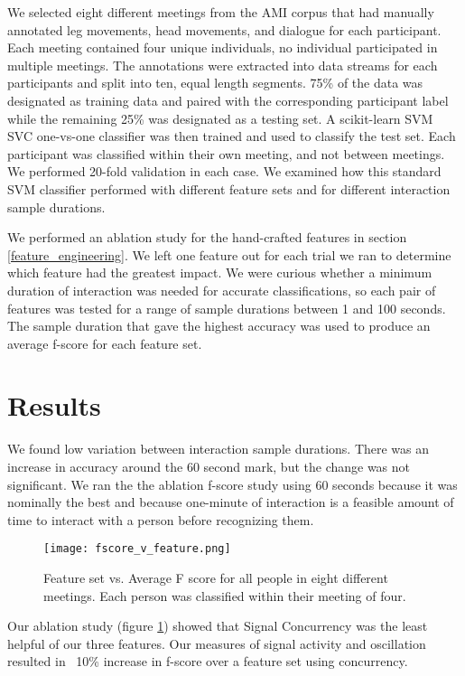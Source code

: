 \documentclass[conference]{IEEEtran}
\begin{document}
We selected eight different meetings from the AMI corpus that had manually annotated leg movements, head movements, and dialogue for each participant. Each meeting contained four unique individuals, no individual participated in multiple meetings. The annotations were extracted into data streams for each participants and split into ten, equal length segments. 75\% of the data was designated as training data and paired with the corresponding participant label while the remaining 25\% was designated as a testing set. A scikit-learn SVM SVC one-vs-one classifier was then trained and used to classify the test set. Each participant was classified within their own meeting, and not between meetings. We performed 20-fold validation in each case. We examined how this standard SVM classifier performed with different feature sets and for different interaction sample durations. 

We performed an ablation study for the hand-crafted features in section \ref{feature_engineering}. We left one feature out for each trial we ran to determine which feature had the greatest impact. We were curious whether a minimum duration of interaction was needed for accurate classifications, so each pair of features was tested for a range of sample durations between 1 and 100 seconds. The sample duration that gave the highest accuracy was used to produce an average f-score for each feature set. 

\section{Results}

We found low variation between interaction sample durations. There was an increase in accuracy around the 60 second mark, but the change was not significant. We ran the the ablation f-score study using 60 seconds because it was nominally the best and because one-minute of interaction is a feasible amount of time to interact with a person before recognizing them.

\begin{figure}[h!]
    \caption{Feature set vs. Average F score for all people in eight different meetings. Each person was classified within their meeting of four.}
    \centering
    \texttt{[image: fscore\_v\_feature.png]}
    \label{fscore}
\end{figure}

Our ablation study (figure \ref{fscore}) showed that Signal Concurrency was the least helpful of our three features. Our measures of signal activity and oscillation resulted in ~10\% increase in f-score over a feature set using concurrency.
\end{document}
